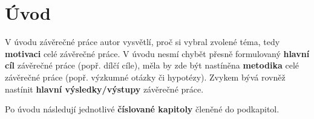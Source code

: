 \chapter*{Úvod}


V úvodu závěrečné práce autor vysvětlí, proč si vybral zvolené téma, tedy \textbf{motivaci} celé závěrečné práce. V úvodu nesmí chybět přesně formulovaný \textbf{hlavní cíl} závěrečné práce (popř. dílčí cíle), měla by zde být nastíněna \textbf{metodika} celé závěrečné práce (popř. výzkumné otázky či hypotézy). Zvykem bývá rovněž nastínit \textbf{hlavní výsledky/výstupy} závěrečné práce. 

Po úvodu následují jednotlivé \textbf{číslované kapitoly} členěné do podkapitol.
